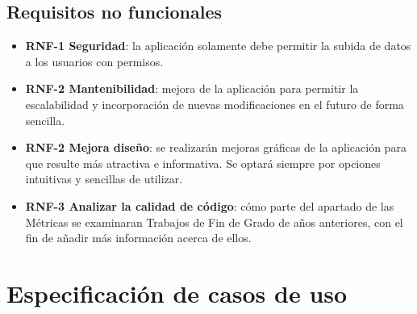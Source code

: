 \subsection{Requisitos no funcionales}
\begin{itemize}
	\item \textbf{RNF-1 Seguridad}: la aplicación solamente debe permitir la subida de datos a los usuarios con permisos.
	
	\item \textbf{RNF-2 Mantenibilidad}: mejora de la aplicación para permitir la escalabilidad y incorporación de nuevas modificaciones en el futuro de forma sencilla. 
	
	\item \textbf{RNF-2 Mejora diseño}: se realizarán mejoras gráficas de la aplicación para que resulte más atractiva e informativa. Se optará siempre por opciones intuitivas y sencillas de utilizar.
	
	\item \textbf{RNF-3 Analizar la calidad de código}: cómo parte del apartado de las Métricas se examinaran Trabajos de Fin de Grado de años anteriores, con el fin de añadir más información acerca de ellos.

\end{itemize}

\section{Especificación de casos de uso}